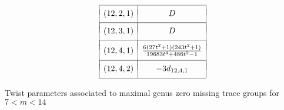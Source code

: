 \begin{table}[!ht]
\[\begin{array}{|c|c|}
\hline
& \\ [-.75em]
(12,2,1) & D \\
& \\ [-.75em]
\hline
& \\ [-.75em]
(12,3,1) & D\\
& \\ [-.75em]
\hline
& \\ [-.75em]
(12,4,1) &  \frac{6(27t^2+1)(243t^2+1)}{19683t^4 + 486t^2 - 1} \\
& \\ [-.75em]
\hline
& \\ [-.75em]
(12,4,2) &  -3d_{12,4,1} \\ [.5em]
\hline
\end{array}
\]

\vspace{.1in}
\caption{ Twist parameters associated to maximal genus zero missing trace groups for $7 < m < 14$}
\label{masterlistoftwistparameters2}
\end{table}

